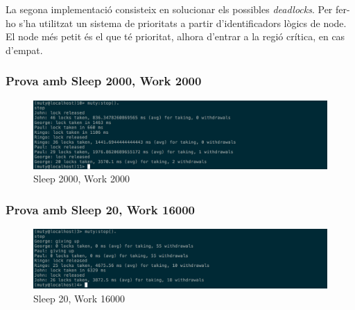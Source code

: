 \documentclass[a4paper, 11pt]{article}
\begin{document}
La segona implementació consisteix en solucionar els possibles \emph{deadlocks}.
Per fer-ho s'ha utilitzat un sistema de prioritats a partir d'identificadors
lògics de node. El node més petit és el que té prioritat, alhora d'entrar a la
regió crítica, en cas d'empat.

\subsubsection{Prova amb Sleep 2000, Work 2000}

\begin{figure}[H]
    \centering
    \includegraphics[width=1.0\textwidth]{figures/2000-2000lock2}
    \caption{Sleep 2000, Work 2000 \label{fig:2000-2000lock2}}    
\end{figure}

\subsubsection{Prova amb Sleep 20, Work 16000}

\begin{figure}[H]
    \centering
    \includegraphics[width=1.0\textwidth]{figures/20-16000lock2}
    \caption{Sleep 20, Work 16000 \label{fig:20-16000lock2}}    
\end{figure}
\end{document}
